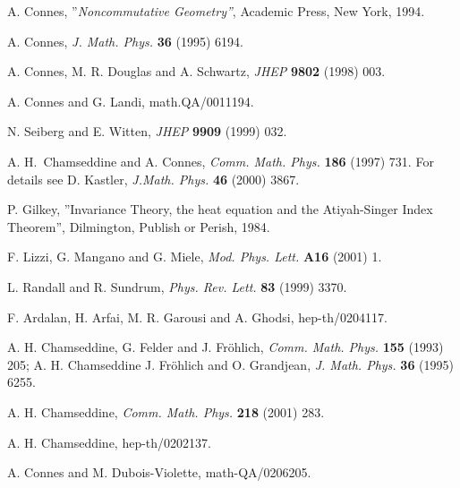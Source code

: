 \documentclass[a4paper,12pt]{article}
\begin{document}
\begin{thebibliography}{99}
A. Connes, ''\textit{Noncommutative Geometry''}, Academic Press,
New York, 1994.

A. Connes, \textit{J. Math. Phys. }\textbf{36 }(1995) 6194.

A. Connes, M. R. Douglas and A. Schwartz, \textit{JHEP
}\textbf{9802 }(1998) 003.

A. Connes and G. Landi, math.QA/0011194.

N. Seiberg and E. Witten, \textit{JHEP }\textbf{9909 }(1999) 032.

A. H.\ Chamseddine and A. Connes, \textit{Comm. Math. Phys.
}\textbf{186 }(1997) 731. For details see D. Kastler, \textit{J.Math. Phys.
}\textbf{46 }(2000) 3867.

P. Gilkey, ''Invariance Theory, the heat equation and the
Atiyah-Singer Index Theorem'', Dilmington, Publish or Perish, 1984.

F. Lizzi, G. Mangano and G. Miele, \textit{Mod. Phys. Lett.
}\textbf{A16 }(2001) 1.

L. Randall and R. Sundrum, \textit{Phys. Rev. Lett. }\textbf{83
}(1999) 3370.

F. Ardalan, H. Arfai, M. R. Garousi and A. Ghodsi, hep-th/0204117.

A. H. Chamseddine, G. Felder and J. Fr\"{o}hlich, \textit{Comm.
Math. Phys. }\textbf{155 }(1993) 205; A. H. Chamseddine J. Fr\"{o}hlich and O.
Grandjean, \textit{J. Math. Phys. }\textbf{36 }(1995) 6255.

A. H. Chamseddine, \textit{Comm. Math. Phys. }\textbf{218
}(2001) 283.

A. H. Chamseddine, hep-th/0202137.

A. Connes and M. Dubois-Violette, math-QA/0206205.
\end{thebibliography}
\end{document}
